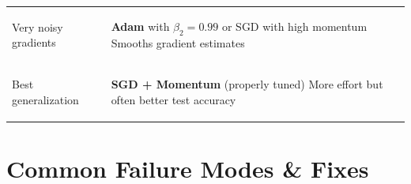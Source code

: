 \documentclass[../main.tex]{subfiles}
\begin{document}
\begin{tcolorbox}[colback=gray!5, colframe=black!70, boxrule=1pt, title={\textbf{Which Optimizer Should I Use?}}, fonttitle=\large\bfseries, coltitle=black, attach boxed title to top center={yshift=-2mm}]
\begin{tabularx}{\textwidth}{@{}>{\bfseries\raggedright}p{3.8cm} >{\raggedright\arraybackslash}X@{}}
Very noisy gradients &
\textbf{Adam} with $\beta_2 = 0.99$ or SGD with high momentum \newline
{\footnotesize Smooths gradient estimates} \\[0.15cm]

Best generalization &
\textbf{SGD + Momentum} (properly tuned) \newline
{\footnotesize More effort but often better test accuracy} \\

\bottomrule
\end{tabularx}
\end{tcolorbox}

\section{Common Failure Modes \& Fixes}\label{sec:cheat-failures}
\end{document}
